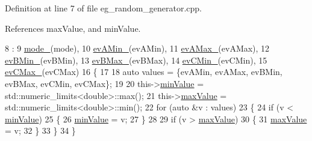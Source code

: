Definition at line 7 of file eg\+\_\+random\+\_\+generator.\+cpp.



References max\+Value, and min\+Value.


\begin{DoxyCode}
8             : 
9               \hyperlink{classsmacc_1_1state__reactors_1_1EgRandomGenerator_a73448940ff292ccc365a68bb39eecdf7}{mode\_}(mode),
10               \hyperlink{classsmacc_1_1state__reactors_1_1EgRandomGenerator_ae8a5afb09e3c5c9aa8e3c5a7a5796338}{evAMin\_}(evAMin),
11               \hyperlink{classsmacc_1_1state__reactors_1_1EgRandomGenerator_a3a86743f2abe30bb0f413dfc5ab4da96}{evAMax\_}(evAMax),
12               \hyperlink{classsmacc_1_1state__reactors_1_1EgRandomGenerator_a11da3ad59bcc4c60e7a4d9b9c88005fa}{evBMin\_}(evBMin),
13               \hyperlink{classsmacc_1_1state__reactors_1_1EgRandomGenerator_a601edeb6cb9b6fc5bf1db173216a550f}{evBMax\_}(evBMax),
14               \hyperlink{classsmacc_1_1state__reactors_1_1EgRandomGenerator_a2b12392b07d0361c72386c9e9cc77695}{evCMin\_}(evCMin),
15               \hyperlink{classsmacc_1_1state__reactors_1_1EgRandomGenerator_a29c801a671adb7edf7753b1f85bf1a12}{evCMax\_}(evCMax)
16         \{
17 
18             \textcolor{keyword}{auto} values = \{evAMin, evAMax, evBMin, evBMax, evCMin, evCMax\};
19 
20             this->\hyperlink{classsmacc_1_1state__reactors_1_1EgRandomGenerator_a0c18129d12648f6d291227b51c379e06}{minValue} = std::numeric\_limits<double>::max();
21             this->\hyperlink{classsmacc_1_1state__reactors_1_1EgRandomGenerator_ae023e8a9bd96b3ee065b8a505dd9ab75}{maxValue} = std::numeric\_limits<double>::min();
22             \textcolor{keywordflow}{for} (\textcolor{keyword}{auto} &v : values)
23             \{
24                 \textcolor{keywordflow}{if} (v < \hyperlink{classsmacc_1_1state__reactors_1_1EgRandomGenerator_a0c18129d12648f6d291227b51c379e06}{minValue})
25                 \{
26                     \hyperlink{classsmacc_1_1state__reactors_1_1EgRandomGenerator_a0c18129d12648f6d291227b51c379e06}{minValue} = v;
27                 \}
28 
29                 \textcolor{keywordflow}{if} (v > \hyperlink{classsmacc_1_1state__reactors_1_1EgRandomGenerator_ae023e8a9bd96b3ee065b8a505dd9ab75}{maxValue})
30                 \{
31                     \hyperlink{classsmacc_1_1state__reactors_1_1EgRandomGenerator_ae023e8a9bd96b3ee065b8a505dd9ab75}{maxValue} = v;
32                 \}
33             \}
34         \}
\end{DoxyCode}


